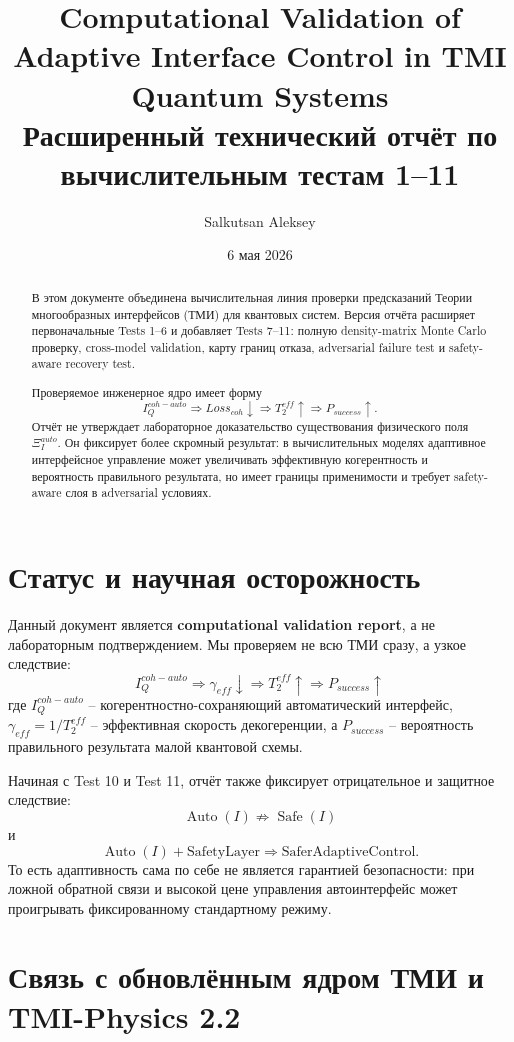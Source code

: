 \documentclass[12pt,a4paper]{article}
\title{\textbf{Computational Validation of Adaptive Interface Control in TMI Quantum Systems}\\
\large Расширенный технический отчёт по вычислительным тестам 1--11}
\author{Salkutsan Aleksey}
\date{6 мая 2026}
\newcommand{\Auto}{\operatorname{Auto}}
\newcommand{\Safe}{\operatorname{Safe}}
\begin{document}
\maketitle

\begin{abstract}
В этом документе объединена вычислительная линия проверки предсказаний Теории многообразных интерфейсов (ТМИ) для квантовых систем. Версия отчёта расширяет первоначальные Tests 1--6 и добавляет Tests 7--11: полную density-matrix Monte Carlo проверку, cross-model validation, карту границ отказа, adversarial failure test и safety-aware recovery test.

Проверяемое инженерное ядро имеет форму
\[
I_Q^{coh-auto}\Rightarrow Loss_{coh}\downarrow\Rightarrow T_2^{eff}\uparrow\Rightarrow P_{success}\uparrow.
\]
Отчёт не утверждает лабораторное доказательство существования физического поля $\Xi_I^{auto}$. Он фиксирует более скромный результат: в вычислительных моделях адаптивное интерфейсное управление может увеличивать эффективную когерентность и вероятность правильного результата, но имеет границы применимости и требует safety-aware слоя в adversarial условиях.
\end{abstract}

\tableofcontents
\newpage

\section{Статус и научная осторожность}

Данный документ является \textbf{computational validation report}, а не лабораторным подтверждением. Мы проверяем не всю ТМИ сразу, а узкое следствие:
\[
\boxed{
I_Q^{coh-auto}
\Rightarrow
\gamma_{eff}\downarrow
\Rightarrow
T_2^{eff}\uparrow
\Rightarrow
P_{success}\uparrow
}
\]
где $I_Q^{coh-auto}$ -- когерентностно-сохраняющий автоматический интерфейс, $\gamma_{eff}=1/T_2^{eff}$ -- эффективная скорость декогеренции, а $P_{success}$ -- вероятность правильного результата малой квантовой схемы.

Начиная с Test 10 и Test 11, отчёт также фиксирует отрицательное и защитное следствие:
\[
\boxed{\Auto(I)\not\Rightarrow \Safe(I)}
\]
и
\[
\boxed{\Auto(I)+\text{SafetyLayer}\Rightarrow \text{SaferAdaptiveControl}.}
\]
То есть адаптивность сама по себе не является гарантией безопасности: при ложной обратной связи и высокой цене управления автоинтерфейс может проигрывать фиксированному стандартному режиму.

\section{Связь с обновлённым ядром ТМИ и TMI-Physics 2.2}
\end{document}
